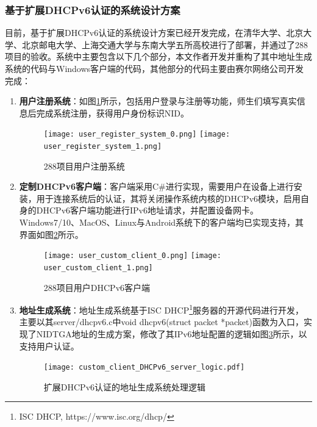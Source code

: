         \subsubsection{基于扩展DHCPv6认证的系统设计方案}
        \label{NIDTGA:DHCPv6:implement:custom}
        目前，基于扩展DHCPv6认证的系统设计方案已经开发完成，在清华大学、北京大学、北京邮电大学、上海交通大学与东南大学五所高校进行了部署，并通过了288项目的验收。系统中主要包含以下几个部分，本文作者开发并重构了其中地址生成系统的代码与Windows客户端的代码，其他部分的代码主要由赛尔网络公司开发完成：
        \begin{enumerate}[1{)}]
          \item \textbf{用户注册系统}：如图\ref{fig:user_register_system}所示，包括用户登录与注册等功能，师生们填写真实信息后完成系统注册，获得用户身份标识NID。
            \begin{figure}[ht]
              \centering
              {\texttt{[image: user\_register\_system\_0.png]}}
              \hspace{2em}
              {\texttt{[image: user\_register\_system\_1.png]}}
              \caption{288项目用户注册系统}
              \label{fig:user_register_system}
            \end{figure}
          \item \textbf{定制DHCPv6客户端}：客户端采用C\#进行实现，需要用户在设备上进行安装，用于连接系统后的认证，其将关闭操作系统内核的DHCPv6模块，启用自身的DHCPv6客户端功能进行IPv6地址请求，并配置设备网卡。Windows7/10、MacOS、Linux与Android系统下的客户端均已实现支持，其界面如图\ref{fig:user_custom_client}所示。
            \begin{figure}[ht]
              \centering
              {\texttt{[image: user\_custom\_client\_0.png]}}
              \hspace{2em}
              {\texttt{[image: user\_custom\_client\_1.png]}}
              \caption{288项目用户DHCPv6客户端}
              \label{fig:user_custom_client}
            \end{figure}
          \item \textbf{地址生成系统}：地址生成系统基于ISC DHCP\footnote{ISC DHCP, https://www.isc.org/dhcp/}服务器的开源代码进行开发，主要以其server/dhcpv6.c中void dhcpv6(struct packet *packet)函数为入口，实现了NIDTGA地址的生成方案，修改了其IPv6地址配置的逻辑如图\ref{fig:custom_client_DHCPv6_server_logic}所示，以支持用户认证。
            \begin{figure}[ht]
              \centering
              \texttt{[image: custom\_client\_DHCPv6\_server\_logic.pdf]}
              \caption{扩展DHCPv6认证的地址生成系统处理逻辑}
              \label{fig:custom_client_DHCPv6_server_logic}
            \end{figure}
          

\end{enumerate}
